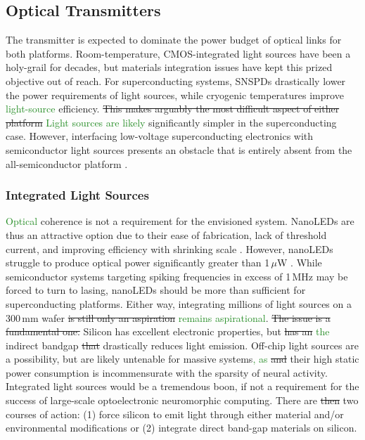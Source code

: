 \documentclass[twocolumn]{article}
\begin{document}
\subsection{Optical Transmitters}
The transmitter is expected to dominate the power budget of optical links for both platforms. Room-temperature, CMOS-integrated light sources have been a holy-grail for decades, but materials integration issues have kept this prized objective out of reach. For superconducting systems, SNSPDs drastically lower the power requirements of light sources, while cryogenic temperatures improve \textcolor{ForestGreen}{light-source} efficiency. \sout{This makes arguably the most difficult aspect of either platform } \textcolor{ForestGreen}{Light sources are likely} significantly simpler in the superconducting case. However, interfacing low-voltage superconducting electronics with semiconductor light sources presents an obstacle that is entirely absent from the all-semiconductor platform \textcolor{ForestGreen}{\cite{mccaughan2019superconducting}}.

\subsubsection{Integrated Light Sources}
\textcolor{ForestGreen}{Optical} coherence is not a requirement for the envisioned system. NanoLEDs are thus an attractive option due to their ease of fabrication, lack of threshold current, and improving efficiency with shrinking scale \cite{romeira2019physical}. However, nanoLEDs struggle to produce optical power significantly greater than 1\,$\mu$W \cite{romeira2019physical}. While semiconductor systems targeting spiking frequencies in excess of 1\,MHz may be forced to turn to lasing, nanoLEDs should be more than sufficient for superconducting platforms. Either way, integrating millions of light sources on a 300\,mm wafer \sout{is still only an aspiration} \textcolor{ForestGreen}{remains aspirational}. \sout{The issue is a fundamental one.} Silicon has excellent electronic properties, but \sout{has an} \textcolor{ForestGreen}{the} indirect bandgap \sout{that} drastically reduces light emission. Off-chip light sources are a possibility, but are likely untenable for massive systems\textcolor{ForestGreen}{, as} \sout{and} their high static power consumption is incommensurate with the sparsity of neural activity. Integrated light sources would be a tremendous boon, if not a requirement for the success of large-scale optoelectronic neuromorphic computing. There are \sout{then} two courses of action: (1) force silicon to emit light through either material and/or environmental modifications or (2) integrate direct band-gap materials on silicon. 
\end{document}
